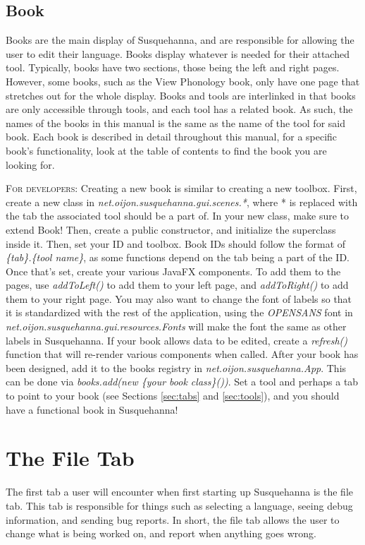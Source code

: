 \documentclass{report}
\begin{document}
	\section{Book}\label{sec:book}
	Books are the main display of Susquehanna, and are responsible for allowing the user to edit their language. Books display whatever is needed for their attached tool. Typically, books have two sections, those being the left and right pages. However, some books, such as the View Phonology book, only have one page that stretches out for the whole display. Books and tools are interlinked in that books are only accessible through tools, and each tool has a related book. As such, the names of the books in this manual is the same as the name of the tool for said book. Each book is described in detail throughout this manual, for a specific book's functionality, look at the table of contents to find the book you are looking for.
	\par
	\begin{tcolorbox}[width=1\textwidth]
		\textsc{For developers:} Creating a new book is similar to creating a new toolbox. First, create a new class in \emph{net.oijon.susquehanna.gui.scenes.*}, where * is replaced with the tab the associated tool should be a part of. In your new class, make sure to extend Book! Then, create a public constructor, and initialize the superclass inside it. Then, set your ID and toolbox. Book IDs should follow the format of \emph{\{tab\}.\{tool name\}}, as some functions depend on the tab being a part of the ID. Once that's set, create your various JavaFX components. To add them to the pages, use \emph{addToLeft()} to add them to your left page, and \emph{addToRight()} to add them to your right page. You may also want to change the font of labels so that it is standardized with the rest of the application, using the \emph{OPENSANS} font in \emph{net.oijon.susquehanna.gui.resources.Fonts} will make the font the same as other labels in Susquehanna. If your book allows data to be edited, create a \emph{refresh()} function that will re-render various components when called. After your book has been designed, add it to the books registry in \emph{net.oijon.susquehanna.App}. This can be done via \emph{books.add(new \{your book class\}())}. Set a tool and perhaps a tab to point to your book (see Sections \ref{sec:tabs} and \ref{sec:tools}), and you should have a functional book in Susquehanna!
	\end{tcolorbox}
	
	\chapter{The File Tab}
	The first tab a user will encounter when first starting up Susquehanna is the file tab. This tab is responsible for things such as selecting a language, seeing debug information, and sending bug reports. In short, the file tab allows the user to change what is being worked on, and report when anything goes wrong.
\end{document}
